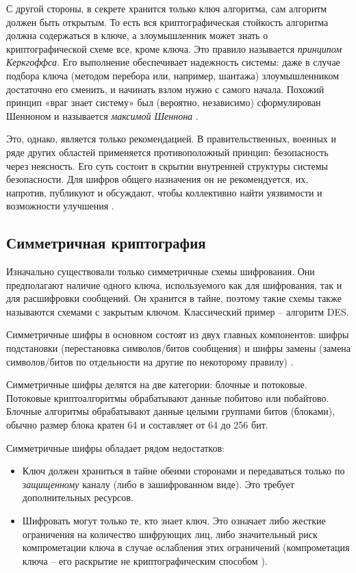 С другой стороны, в секрете хранится только ключ алгоритма, сам алгоритм должен быть открытым. То есть вся криптографическая стойкость алгоритма должна содержаться в ключе, а злоумышленник может знать о криптографической схеме все, кроме ключа. Это правило называется \textit{принципом Керкгоффса}. Его выполнение обеспечивает надежность системы: даже в случае подбора ключа (методом перебора или, например, шантажа) злоумышленником достаточно его сменить, и начинать взлом нужно с самого начала. Похожий принцип «враг знает систему» был (вероятно, независимо) сформулирован Шенноном и называется \textit{максимой Шеннона} \cite{src13}.

Это, однако, является только рекомендацией. В правительственных, военных и ряде других областей применяется противоположный принцип: безопасность через неясность. Его суть состоит в скрытии внутренней структуры системы безопасности. Для шифров общего назначения он не рекомендуется, их, напротив, публикуют и обсуждают, чтобы коллективно найти уязвимости и возможности улучшения \cite{src14}.

\subsection{Симметричная криптография} %

Изначально существовали только симметричные схемы шифрования. Они предполагают наличие одного ключа, используемого как для шифрования, так и для расшифровки сообщений. Он хранится в тайне, поэтому такие схемы также называются схемами с закрытым ключом. Классический пример – алгоритм DES.

Симметричные шифры в основном состоят из двух главных компонентов: шифры подстановки (перестановка символов/битов сообщения) и шифры замены (замена символов/битов по отдельности на другие по некоторому правилу) \cite{src8}. 

Симметричные шифры делятся на две категории: блочные и потоковые. Потоковые криптоалгоритмы обрабатывают данные побитово или побайтово. Блочные алгоритмы обрабатывают данные целыми группами битов (блоками), обычно размер блока кратен 64 и составляет от 64 до 256 бит.

Симметричные шифры обладает рядом недостатков:
\begin{itemize}
	\item Ключ должен храниться в тайне обеими сторонами и передаваться только по \textit{защищенному} каналу (либо в зашифрованном виде). Это требует дополнительных ресурсов.
	\item Шифровать могут только те, кто знает ключ. Это означает либо жесткие ограничения на количество шифрующих лиц, либо значительный риск компрометации ключа в случае ослабления этих ограничений (компрометация ключа – его раскрытие не криптографическим способом \cite{src15}).
\end{itemize}

